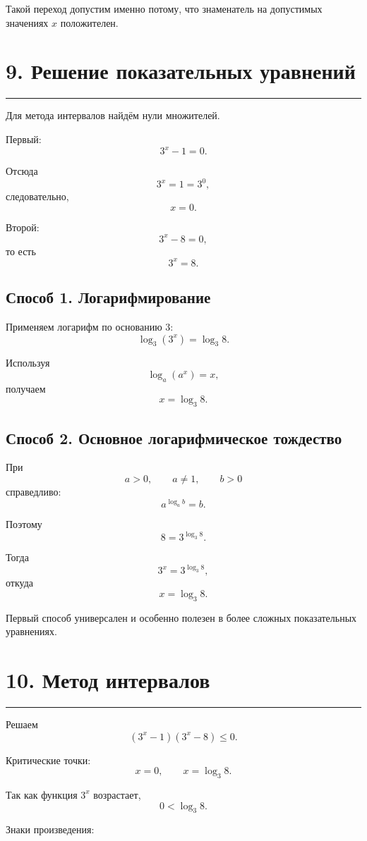 \documentclass[a4paper,12pt]{article}
\newcommand{\topicline}{%
  \par\noindent
  {\color{accent!55}\rule{\linewidth}{0.6pt}}
  \par
}
\begin{document}
Такой переход допустим именно потому, что знаменатель на допустимых значениях \(x\) положителен.

\section*{\color{darkaccent}9. Решение показательных уравнений}
\topicline

Для метода интервалов найдём нули множителей.

Первый:
\[
3^x-1=0.
\]

Отсюда
\[
3^x=1=3^0,
\]
следовательно,
\[
x=0.
\]

Второй:
\[
3^x-8=0,
\]
то есть
\[
3^x=8.
\]

\subsection*{\color{accent}Способ 1. Логарифмирование}

Применяем логарифм по основанию \(3\):
\[
\log_3(3^x)=\log_3 8.
\]

Используя
\[
\log_a(a^x)=x,
\]
получаем
\[
\boxed{x=\log_3 8}.
\]

\subsection*{\color{accent}Способ 2. Основное логарифмическое тождество}

При
\[
a>0,\qquad a\ne1,\qquad b>0
\]
справедливо:
\[
\boxed{a^{\log_a b}=b}.
\]

Поэтому
\[
8=3^{\log_3 8}.
\]

Тогда
\[
3^x=3^{\log_3 8},
\]
откуда
\[
x=\log_3 8.
\]

Первый способ универсален и особенно полезен в более сложных показательных уравнениях.

\section*{\color{darkaccent}10. Метод интервалов}
\topicline

Решаем
\[
(3^x-1)(3^x-8)\le0.
\]

Критические точки:
\[
x=0,
\qquad
x=\log_3 8.
\]

Так как функция \(3^x\) возрастает,
\[
0<\log_3 8.
\]

Знаки произведения:
\end{document}
